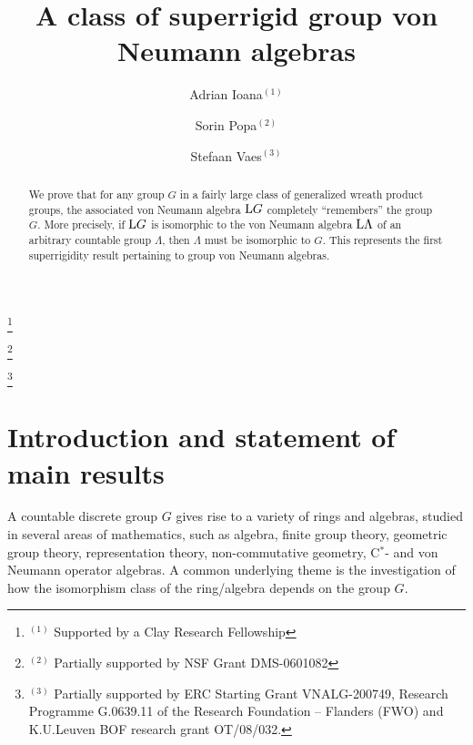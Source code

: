 \documentclass[a4paper,11pt]{amsart}
\numberwithin{equation}{section}
\begin{document}
\title[A class of superrigid group von Neumann algebras]{A class of superrigid group von Neumann algebras}

\author[Adrian Ioana]{Adrian Ioana$^{(1)}$}
\thanks{\mbox{}$^{(1)}$ Supported by a Clay Research Fellowship}
\address{Mathematics Department; University of California at Los Angeles, CA 90095-1555 (United States).}

\author[Sorin Popa]{Sorin Popa$^{(2)}$}
\thanks{\mbox{}$^{(2)}$ Partially supported by NSF Grant DMS-0601082}
\address{Mathematics Department; University of California at Los Angeles, CA 90095-1555 (United States).}

\author[Stefaan Vaes]{Stefaan Vaes$^{(3)}$}
\thanks{\mbox{}$^{(3)}$ Partially
    supported by ERC Starting Grant VNALG-200749, Research
    Programme G.0639.11 of the Research Foundation --
    Flanders (FWO) and K.U.Leuven BOF research grant OT/08/032.}
\address{Department of Mathematics;
    K.U.Leuven; Celestijnenlaan 200B; B--3001 Leuven (Belgium).}



\begin{abstract}
We prove that for any group  $G$ in a fairly large class of
generalized wreath product groups, the associated von Neumann
algebra ${\mathord{\text{\rm L}}} G$ completely ``remembers'' the group $G$. More
precisely, if ${\mathord{\text{\rm L}}} G$ is isomorphic to the von Neumann algebra ${\mathord{\text{\rm L}}}
\Lambda$ of an arbitrary countable group $\Lambda$, then $\Lambda$
must be isomorphic to $G$. This represents the first superrigidity
result pertaining to group von Neumann algebras.
\end{abstract}

\maketitle

\section{Introduction and statement of main results}

A countable discrete group $G$ gives rise to a variety of rings and
algebras, studied in several areas of mathematics, such as algebra,
finite group theory, geometric group theory, representation theory,
non-commutative geometry, C$^*$- and von Neumann operator algebras.
A common underlying theme is the investigation of how the
isomorphism class of the ring/algebra depends on the group $G$.
\end{document}
